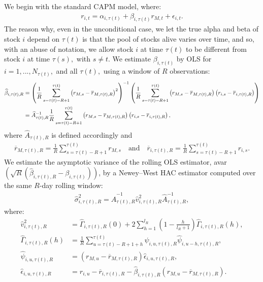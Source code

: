 We begin with the standard CAPM model, where:
\begin{align*}
    r_{i,t} = \alpha_{i,\tau(t)} + \beta_{i,\tau(t)} r_{M,t} + \epsilon_{i,t}.
\end{align*}
The reason why, even in the unconditional case, we let the true alpha and beta of stock $i$  depend on $\tau(t)$ is that the pool of stocks alive varies over time, and so, with an abuse of notation, we allow stock $i$ at time $\tau(t) $ to be different from stock $i$ at time $\tau(s) ,$ with $s\neq t.$ We estimate $\beta _{i,\tau(t) }$ by OLS for $i=1,...,N_{\tau(t)},$ and all $\tau(t),$ using a window of $R$ observations:
\begin{align}
    \widehat{\beta }_{i,\tau(t),R} &= \left( \frac{1}{R}\sum_{s=\tau(t)-R+1}^{\tau(t) }\left( r_{M,s}-\overline{r}_{M,\tau(t),R}\right)^{2}\right)^{-1} \left( \frac{1}{R}\sum_{s=\tau(t)-R+1}^{\tau(t)}\left( r_{M,s}-\overline{r}_{M,\tau(t),R}\right) \left( r_{i,s}-\overline{r}_{i,\tau(t),R}\right) \right) \notag \\
    &= \widehat{A}_{\tau(t),R}^{-1}\frac{1}{R} \sum_{s=\tau(t) -R+1}^{\tau(t)}\left( r_{M,s}-\overline{r}_{M,\tau(t),R}\right) \left( r_{i,s} - \overline{r}_{i,\tau(t),R}\right), \label{betahat}
\end{align}
where $\widehat{A}_{\tau(t),R}$ is defined accordingly and
\begin{align*}
    \overline{r}_{M,\tau(t),R}=\frac{1}{R}\sum_{s=\tau(t)-R+1}^{\tau(t)} r_{M,s} \quad \text{and} \quad \overline{r}_{i,\tau(t),R}=\frac{1}{R}\sum_{s=\tau(t)-R+1}^{\tau(t)} r_{i,s}.
\end{align*}
We estimate the asymptotic variance of the rolling OLS estimator, \textrm{avar}$\left( \sqrt{R}\left( \widehat{\beta}_{i,\tau(t),R} -  \beta_{i,\tau(t)}\right) \right)$, by a Newey--West HAC estimator computed over the same $R$-day rolling window:
\begin{align}
    \widehat{\sigma}_{i,\tau(t),R}^{2}
    = \widehat{A}_{\tau(t),R}^{-1}\widehat{v}_{i,\tau(t),R}^{2}\widehat{A}_{\tau(t),R}^{-1}, \label{sigma-hat}
\end{align}
where:
\begin{align*}
    \widehat{v}_{i,\tau(t),R}^{2}
    &= \widehat{\Gamma}_{i,\tau(t),R}(0)
       +2\sum_{h=1}^{l_R}\left(1-\frac{h}{l_R+1}\right)\widehat{\Gamma}_{i,\tau(t),R}(h),\\
    \widehat{\Gamma}_{i,\tau(t),R}(h)
    &= \frac{1}{R}\sum_{u=\tau(t)-R+1+h}^{\tau(t)}
       \widehat{\psi}_{i,u,\tau(t),R}\widehat{\psi}_{i,u-h,\tau(t),R},\\
    \widehat{\psi}_{i,u,\tau(t),R}
    &= \left(r_{M,u}-\overline{r}_{M,\tau(t),R}\right)\widehat{\epsilon}_{i,u,\tau(t),R},\\
    \widehat{\epsilon}_{i,u,\tau(t),R}
    &= r_{i,u}-\overline{r}_{i,\tau(t),R}
       -\widehat{\beta}_{i,\tau(t),R}\left(r_{M,u}-\overline{r}_{M,\tau(t),R}\right).
\end{align*}
